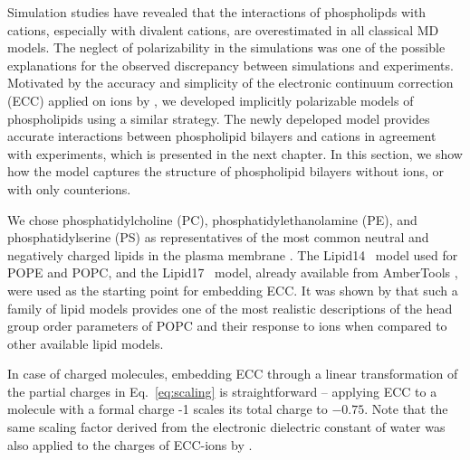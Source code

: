 Simulation studies have revealed that the interactions of phospholipds with cations, especially with divalent cations, 
are overestimated in all classical MD models. \citep{catte16,nmrlipids_proj4}
The neglect of polarizability in the simulations was one of the possible explanations for the observed discrepancy between simulations and experiments. 
Motivated by the accuracy and simplicity of the electronic continuum correction (ECC) applied on ions by \citep{martinek17},
we developed implicitly polarizable models of phospholipids using a similar strategy. 
The newly depeloped model provides accurate interactions between phospholipid bilayers and cations in agreement with experiments, 
which is presented in the next chapter.  
In this section, we show how the model captures the structure of phospholipid bilayers without ions, or with only counterions. 

We chose phosphatidylcholine (PC), phosphatidylethanolamine (PE), and phosphatidylserine (PS)
as representatives of the most common neutral and negatively charged lipids in the plasma membrane \citep{kroon2011_lipid_map, marsh13}. 
The Lipid14~\citep{dickson14} model used for POPE and POPC,
and the Lipid17~\citep{lipid17-future} model, already available from AmberTools \citep{ferrer13},
were used as the starting point for embedding ECC.
It was shown by \citet{botan15, catte16} that such a family of lipid models provides one of the most 
realistic descriptions of the head group order parameters of POPC and their response to ions 
when compared to other available lipid models. 

In case of charged molecules, 
embedding ECC through a linear transformation of the partial charges in Eq.~\ref{eq:scaling} is straightforward -- 
applying ECC to a molecule with a formal charge -1 scales its total charge to $-0.75$. 
Note that the same scaling factor derived from the electronic dielectric constant of water 
was also applied to the charges of ECC-ions by \citet{Pluharova2014, kohagen14, kohagen16, martinek17}.

